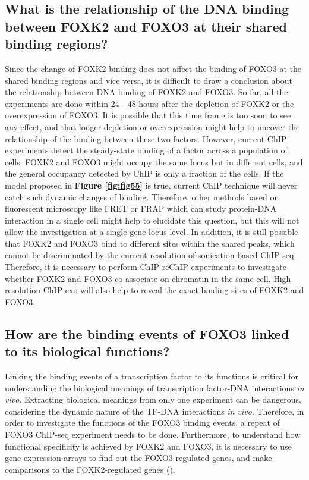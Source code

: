 \subsection{What is the relationship of the DNA binding between FOXK2 and FOXO3 at their shared binding regions?}

Since the change of FOXK2 binding does not affect the binding of FOXO3 at the shared binding regions and vice versa, it is difficult to draw a conclusion about the relationship between DNA binding of FOXK2 and FOXO3. So far, all the experiments are done within 24 - 48 hours after the depletion of FOXK2 or the overexpression of FOXO3. It is possible that this time frame is too soon to see any effect, and that longer depletion or overexpression might help to uncover the relationship of the binding between these two factors. However, current ChIP experiments detect the steady-state binding of a factor across a population of cells. FOXK2 and FOXO3 might occupy the same locus but in different cells, and the general occupancy detected by ChIP is only a fraction of the cells. If the model proposed in \textbf{Figure \ref{fig:fig55}} is true, current ChIP technique will never catch such dynamic changes of binding. Therefore, other methods based on fluorescent microscopy like FRET or FRAP which can study protein-DNA interaction in a single cell might help to elucidate this question, but this will not allow the investigation at a single gene locus level. In addition, it is still possible that FOXK2 and FOXO3 bind to different sites within the shared peaks, which cannot be discriminated by the current resolution of sonication-based ChIP-seq. Therefore, it is necessary to perform ChIP-reChIP experiments to investigate whether FOXK2 and FOXO3 co-associate on chromatin in the same cell. High resolution ChIP-exo will also help to reveal the exact binding sites of FOXK2 and FOXO3.

\subsection{How are the binding events of FOXO3 linked to its biological functions?}

Linking the binding events of a transcription factor to its functions is critical for understanding the biological meanings of transcription factor-DNA interactions \textit{in vivo}. Extracting biological meanings from only one experiment can be dangerous, considering the dynamic nature of the TF-DNA interactions \textit{in vivo}. Therefore, in order to investigate the functions of the FOXO3 binding events, a repeat of FOXO3 ChIP-seq experiment needs to be done. Furthermore, to understand how functional specificity is achieved by FOXK2 and FOXO3, it is necessary to use gene expression arrays to find out the FOXO3-regulated genes, and make comparisons to the FOXK2-regulated genes (\cite{ji2012the}).